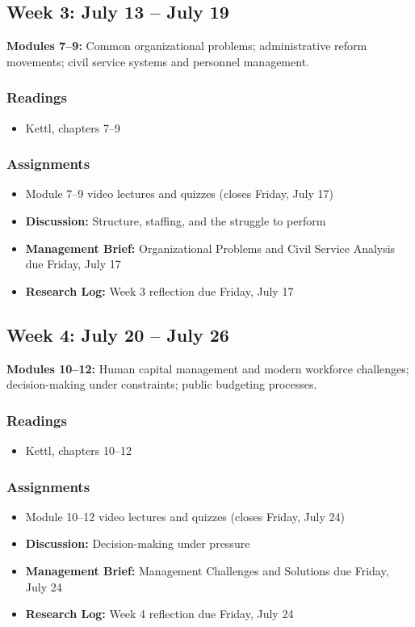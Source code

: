 \documentclass[12pt]{article}
\begin{document}
\subsection*{Week 3: July 13 -- July 19}
\noindent \textbf{Modules 7--9:} Common organizational problems; administrative reform movements; civil service systems and personnel management.
\subsubsection*{Readings}
    \begin{itemize}
        \item Kettl, chapters 7--9
    \end{itemize}
\subsubsection*{Assignments}
    \begin{itemize}
        \item Module 7--9 video lectures and quizzes (closes Friday, July 17)
        \item \textbf{Discussion:} Structure, staffing, and the struggle to perform
        \item \textbf{Management Brief:} Organizational Problems and Civil Service Analysis due Friday, July 17
        \item \textbf{Research Log:} Week 3 reflection due Friday, July 17
    \end{itemize}

\subsection*{Week 4: July 20 -- July 26}
\noindent \textbf{Modules 10--12:} Human capital management and modern workforce challenges; decision-making under constraints; public budgeting processes.
\subsubsection*{Readings}
    \begin{itemize}
        \item Kettl, chapters 10--12
    \end{itemize}
\subsubsection*{Assignments}
    \begin{itemize}
        \item Module 10--12 video lectures and quizzes (closes Friday, July 24)
        \item \textbf{Discussion:} Decision-making under pressure
        \item \textbf{Management Brief:} Management Challenges and Solutions due Friday, July 24
        \item \textbf{Research Log:} Week 4 reflection due Friday, July 24
    \end{itemize}
\end{document}
